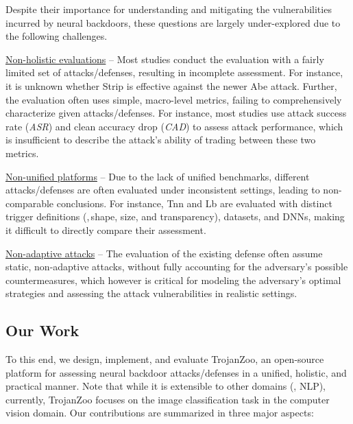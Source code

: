 \documentclass[compsoc,conference,a4paper,10pt,times]{IEEEtran}
\newcommand{\system}{{\sc \small TrojanZoo}\xspace}
\newcommand{\tnn}{{\sc Tnn}\xspace}
\newcommand{\lb}{{\sc Lb}\xspace}
\newcommand{\abe}{{\sc Abe}\xspace}
\newcommand{\asr}{{\em \small ASR}\xspace}
\newcommand{\cad}{{\em \small CAD}\xspace}
\newcommand{\strip}{{\sc Strip}\xspace}
\begin{document}
\vspace{2pt}

Despite their importance for understanding and mitigating the vulnerabilities incurred by neural backdoors, these questions are largely under-explored due to the following challenges. 

\vspace{1pt}
\underline{Non-holistic evaluations} -- Most studies conduct the evaluation with a fairly limited set of attacks/defenses, resulting in incomplete assessment. For instance, it is unknown whether {\strip} is effective against the newer {\abe} attack. Further, the evaluation often uses simple, macro-level metrics, failing to comprehensively characterize given attacks/defenses. For instance, most studies use attack success rate (\asr) and clean accuracy drop (\cad) to assess attack performance, which is insufficient to describe the attack's ability of trading between these two metrics.  

\vspace{1pt}
\underline{Non-unified platforms} -- Due to the lack of unified benchmarks, different attacks/defenses are often evaluated under inconsistent settings, leading to non-comparable conclusions. For instance, {\tnn} and {\lb} are evaluated with distinct trigger definitions (\mie,\,shape, size, and transparency), datasets, and DNNs, making it difficult to directly compare their assessment. 

\vspace{1pt}
\underline{Non-adaptive attacks} --  The evaluation of the existing defense often assume static, non-adaptive attacks, without fully accounting for the adversary's possible countermeasures, which however is critical for modeling the adversary's optimal strategies and assessing the attack vulnerabilities in realistic settings.


\subsection*{Our Work} To this end, we design, implement, and evaluate \system, an open-source platform for assessing neural backdoor attacks/defenses in a unified, holistic, and practical manner. Note that while it is extensible to other domains (\meg, NLP), currently, \system focuses on the image classification task in the computer vision domain. Our contributions are summarized in three major aspects: 
\end{document}
